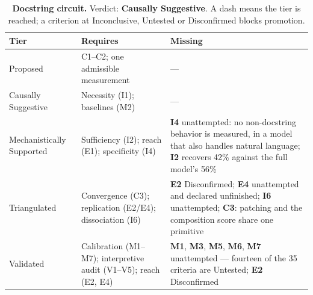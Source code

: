 \begin{table}[H]
\centering
\footnotesize
\caption{\textbf{Docstring circuit.} Verdict: \textbf{Causally Suggestive}. A dash means the tier is reached; a criterion at
Inconclusive, Untested or Disconfirmed blocks promotion.}
\label{tab:docstring-verdict}
\renewcommand{\arraystretch}{1.18}
\begin{tabular}{@{}l>{\raggedright\arraybackslash}p{3.6cm}>{\raggedright\arraybackslash}p{4.4cm}@{}}
\toprule
\textbf{Tier} & \textbf{Requires} & \textbf{Missing} \\
\midrule
Proposed & C1--C2; one admissible measurement & --- \\
\addlinespace[2pt]
Causally Suggestive & Necessity (I1); baselines (M2) & --- \\
\addlinespace[2pt]
Mechanistically Supported & Sufficiency (I2); reach (E1); specificity (I4) & \textbf{I4} unattempted: no non-docstring behavior is measured, in a model that also handles natural language; \textbf{I2} recovers 42\% against the full model's 56\% \\
\addlinespace[2pt]
Triangulated & Convergence (C3); replication (E2/E4); dissociation (I6) & \textbf{E2} Disconfirmed; \textbf{E4} unattempted and declared unfinished; \textbf{I6} unattempted; \textbf{C3}: patching and the composition score share one primitive \\
\addlinespace[2pt]
Validated & Calibration (M1--M7); interpretive audit (V1--V5); reach (E2, E4) & \textbf{M1}, \textbf{M3}, \textbf{M5}, \textbf{M6}, \textbf{M7} unattempted --- fourteen of the 35 criteria are Untested; \textbf{E2} Disconfirmed \\
\bottomrule
\end{tabular}
\end{table}
